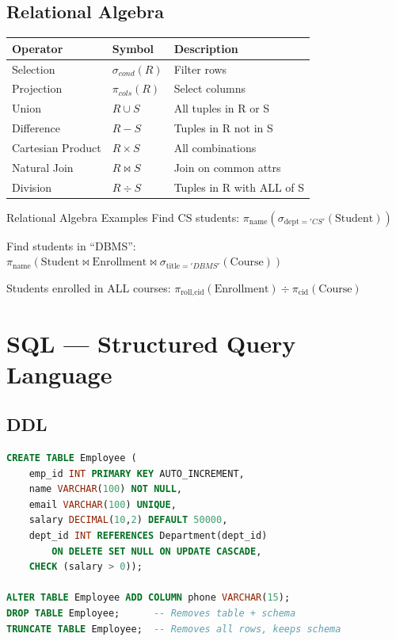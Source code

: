 \documentclass[12pt,a4paper]{article}
\begin{document}
\subsection{Relational Algebra}
\begin{center}
\begin{tabular}{@{}l l p{5cm}@{}}
\toprule
\textbf{Operator} & \textbf{Symbol} & \textbf{Description} \\
\midrule
Selection & $\sigma_{cond}(R)$ & Filter rows \\
Projection & $\pi_{cols}(R)$ & Select columns \\
Union & $R \cup S$ & All tuples in R or S \\
Difference & $R - S$ & Tuples in R not in S \\
Cartesian Product & $R \times S$ & All combinations \\
Natural Join & $R \bowtie S$ & Join on common attrs \\
Division & $R \div S$ & Tuples in R with ALL of S \\
\bottomrule
\end{tabular}
\end{center}

\begin{examplebox}{Relational Algebra Examples}
Find CS students: $\pi_{\text{name}}(\sigma_{\text{dept}='CS'}(\text{Student}))$

Find students in ``DBMS'': $\pi_{\text{name}}(\text{Student} \bowtie \text{Enrollment} \bowtie \sigma_{\text{title}='DBMS'}(\text{Course}))$

Students enrolled in ALL courses: $\pi_{\text{roll,cid}}(\text{Enrollment}) \div \pi_{\text{cid}}(\text{Course})$
\end{examplebox}

\section{SQL --- Structured Query Language}

\subsection{DDL}
\begin{lstlisting}[language=SQL]
CREATE TABLE Employee (
    emp_id INT PRIMARY KEY AUTO_INCREMENT,
    name VARCHAR(100) NOT NULL,
    email VARCHAR(100) UNIQUE,
    salary DECIMAL(10,2) DEFAULT 50000,
    dept_id INT REFERENCES Department(dept_id)
        ON DELETE SET NULL ON UPDATE CASCADE,
    CHECK (salary > 0));

ALTER TABLE Employee ADD COLUMN phone VARCHAR(15);
DROP TABLE Employee;      -- Removes table + schema
TRUNCATE TABLE Employee;  -- Removes all rows, keeps schema
\end{lstlisting}
\end{document}
